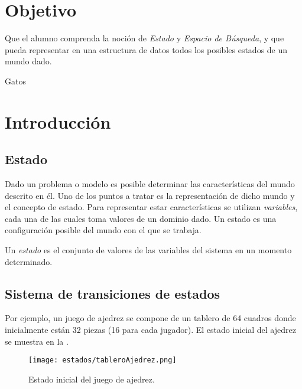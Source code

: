 

\section{Objetivo}
Que el alumno comprenda la noción de \emph{Estado} y \emph{Espacio de Búsqueda}, y que pueda representar en una estructura de datos todos los posibles estados de un mundo dado. \par

\begin{auxcode}
 \caption{Gatos}
 \centering
\end{auxcode}

\section{Introducci\'on}

\subsection{Estado}

Dado un problema o modelo es posible determinar las características del mundo descrito en él.  Uno de los puntos a tratar es la representación de dicho mundo y el concepto de estado.  Para representar estar características se utilizan \emph{variables}, cada una de las cuales toma valores de un dominio dado.  Un estado es una configuración posible del mundo con el que se trabaja.

\begin{definition}[Estado]
 Un \emph{estado} es el conjunto de valores de las variables del sistema en un momento determinado.
\end{definition}


\subsection{Sistema de transiciones de estados}

Por ejemplo, un juego de ajedrez se compone de un tablero de 64 cuadros donde inicialmente están 32 piezas (16 para cada jugador). El estado inicial del ajedrez se muestra en la .\par

\begin{figure}
  \centering
  \texttt{[image: estados/tableroAjedrez.png]}
  \caption{Estado inicial del juego de ajedrez.}
  \label{fig:ajedrez}
\end{figure}


